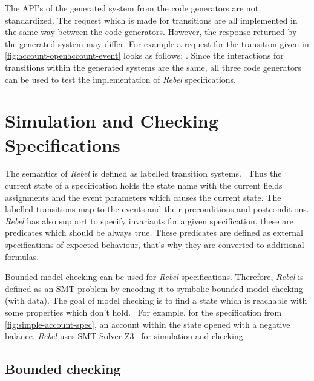 The API's of the generated system from the code generators are not standardized. The request which is made for transitions are all implemented in the same way between the code generators. However, the response returned by the generated system may differ. For example a request for the transition given in \autoref{fig:account-openaccount-event} looks as follows: . Since the interactions for transitions within the generated systems are the same, all three code generators can be used to test the implementation of \textit{Rebel} specifications.

\section{Simulation and Checking Specifications}


The semantics of \textit{Rebel} is defined as labelled transition systems.~\cite[p.~5]{stoel_storm_vinju_bosman_2016} Thus the current state of a specification holds the state name with the current fields assignments and the event parameters which causes the current state. The labelled transitions map to the events and their preconditions and postconditions. \textit{Rebel} has also support to specify invariants for a given specification, these are predicates which should be always true. These predicates are defined as external specifications of expected behaviour, that's why they are converted to additional formulas. 


Bounded model checking can be used for \textit{Rebel} specifications. Therefore, \textit{Rebel} is defined as an SMT problem by encoding it to symbolic bounded model checking (with data). The goal of model checking is to find a state which is reachable with some properties which don't hold.~\cite[p.~5]{stoel_storm_vinju_bosman_2016} For example, for the specification from \autoref{fig:simple-account-spec}, an account within the state opened with a negative balance. \textit{Rebel} uses SMT Solver Z3~\cite{moura_bjorner_2008} for simulation and checking.

\subsection{Bounded checking}


